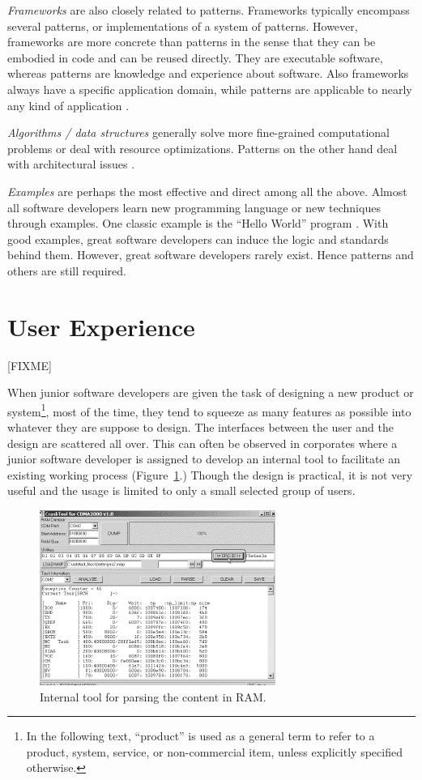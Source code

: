 \documentclass{acm_proc_article-sp}
\begin{document}
\textit{Frameworks} are also closely related to patterns. Frameworks
typically encompass several patterns, or implementations of a system
of patterns. However, frameworks are more concrete than patterns in
the sense that they can be embodied in code and can be reused
directly. They are executable software, whereas patterns are knowledge
and experience about software. Also frameworks always have a specific
application domain, while patterns are applicable to nearly any kind
of application \citep{patterns:gamma}.

\textit{Algorithms / data structures} generally solve more
fine-grained computational problems or deal with resource
optimizations. Patterns on the other hand deal with architectural
issues \citep{patterns:appleton}.

\textit{Examples} are perhaps the most effective and direct among all
the above. Almost all software developers learn new programming
language or new techniques through examples. One classic example is
the ``Hello World'' program \citep{c:kernighan}. With good examples,
great software developers can induce the logic and standards behind
them. However, great software developers rarely exist. Hence patterns
and others are still required.


\section{User Experience}
\label{sec:ux}
[FIXME]

When junior software developers are given the task of designing a new
product or system\footnote{In the following text, ``product'' is used
  as a general term to refer to a product, system, service, or
  non-commercial item, unless explicitly specified otherwise.}, most
of the time, they tend to squeeze as many features as possible into
whatever they are suppose to design. The interfaces between the user
and the design are scattered all over. This can often be observed in
corporates where a junior software developer is assigned to develop an
internal tool to facilitate an existing working process
(Figure~\ref{fig:featureful}.)  Though the design is practical, it is
not very useful and the usage is limited to only a small selected
group of users.

\begin{figure}[!t]
\centering
\includegraphics[width=.7\columnwidth]{featureful}
\caption{Internal tool for parsing the content in RAM.}
\label{fig:featureful}
\end{figure}
\end{document}
